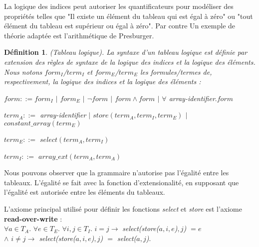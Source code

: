 \documentclass[11pt,openany]{article}
\newtheorem{definition}{D\'efinition}[subsection]
\begin{document}
	La logique des indices peut autoriser les quantificateurs pour mod\'eliser des propri\'et\'es telles que "Il existe un \'el\'ement du tableau qui est \'egal \`a z\'ero" ou "tout \'el\'ement du tableau est sup\'erieur ou \'egal \`a z\'ero". Par contre Un exemple de th\'eorie adapt\'ee est l'arithm\'etique de Presburger.
	
	\begin{definition}
(Tableau logique). La syntaxe d'un tableau logique est d\'efinie par extension des r\`egles de syntaxe de la logique des indices et la logique des \'el\'ements. Nous notons $form_{I}$/$term_{I}$ et $form_{E}$/$term_{E}$ les formules/termes de, respectivement, la logique des indices et la logique des \'el\'ements :\par
$form ::= form_{I}$ $|$ $form_{E}$ $|$ $\neg form$ $|$ $form\land form$ $|$ $\forall$ array-identifier$. form$\par
$term_{A} ::=$ array-identifier $|$ $store(term_{A},term_{I},term_{E})$ $|$ $constant\_array(term_{E})$\par
$term_{E} ::=$ $select(term_{A},term_{I})$\par
$term_{I} ::=$ $array\_ext(term_{A},term_{A})$

\end{definition}
	Nous pouvons observer que la grammaire n'autorise pas l'\'egalit\'e entre les tableaux. L'\'egalit\'e se fait avec la fonction d'extensionalit\'e, en supposant que l'\'egalit\'e est autoris\'ee entre les \'el\'ements du tableaux.
	
		L'axiome principal utilis\'e pour d\'efinir les fonctions \textit{select} et \textit{store} est l'axiome \textbf{read-over-write} :\\
	$\forall a\in T_{A}.$ $\forall e\in T_{E}.$ $\forall i,j\in T_{I}.$ $i=j \rightarrow$ \textit{select(store($a,i,e$)$,j$) $ = e$
			\\ $\land$ $i\neq j \rightarrow$ select(store($a,i,e$)$,j$) $=$ select($a,j$)}.
			
\end{document}

